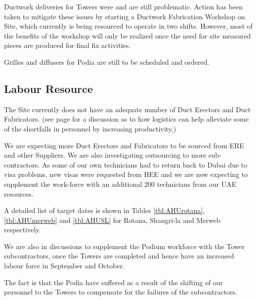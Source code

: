 Ductwork deliveries for Towers were and are still problematic. Action has been taken to mitigate these issues by starting a Ductwork Fabrication Workshop on Site, which currently is being resourced to operate in two shifts. However, most of the benefits of the workshop will only be realized once the need for site measured pieces are produced for final fix activities.

Grilles and diffusers for Podia are still to be scheduled and ordered. 

\subsection{Labour Resource}

The Site currently does not have an adequate number of Duct Erectors and Duct Fabricators.  (see page \pageref{sec:logistics} for a discussion as to how logistics can help alleviate some of the shortfalls in personnel by increasing productivity.)

We are expecting more Duct Erectors and Fabricators to be sourced from ERE and other Suppliers. We are also investigating outsourcing to more sub-contractors. As some of our own technicians had to return back to Dubai due to visa problems, new visas were requested from HEE and we are now expecting to supplement the work-force with an additional 200 technicians from our UAE resources.

A detailed list of target dates is shown in Tables \ref{tbl:AHUrotana}, \ref{tbl:AHUmerweb} and \ref{tbl:AHUSL} for Rotana, Shangri-la and Merweb respectively. 

We are also in discussions to supplement the Podium workforce with the Tower subcontractors, once the Towers are completed and hence have an increased labour force in September and October.

The fact is that the Podia have suffered as a result of the shifting of our personnel to the Towers to compensate for the failures of the subcontractors. 

